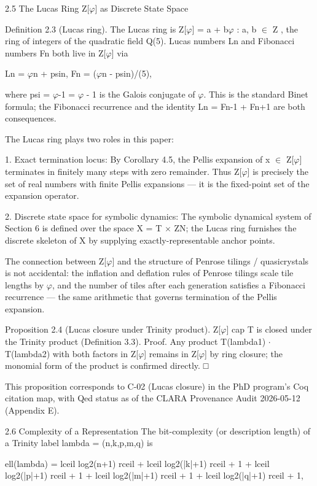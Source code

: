   2.5 The Lucas Ring Z[$\varphi$] as Discrete State Space

        Definition 2.3 (Lucas ring). The Lucas ring is Z[$\varphi$] = { a + b$\varphi$ : a, b $\in$ Z }, the
        ring of integers of the quadratic field Q(5). Lucas numbers Ln and Fibonacci
        numbers Fn both live in Z[$\varphi$] via

  Ln = $\varphi$n + psin, Fn = ($\varphi$n - psin)/(5),

  where psi = $\varphi$-1 = $\varphi$ - 1 is the Galois conjugate of $\varphi$. This is the standard Binet formula;
  the Fibonacci recurrence and the identity Ln = Fn-1 + Fn+1 are both consequences.

  The Lucas ring plays two roles in this paper:

  1. Exact termination locus: By Corollary 4.5, the Pellis expansion of x $\in$ Z[$\varphi$] terminates
  in finitely many steps with zero remainder. Thus Z[$\varphi$] is precisely the set of real
  numbers with finite Pellis expansions --- it is the fixed-point set of the expansion
  operator.

  2. Discrete state space for symbolic dynamics: The symbolic dynamical system of
  Section 6 is defined over the space X = T $\times$ ZN; the Lucas ring furnishes the discrete
  skeleton of X by supplying exactly-representable anchor points.

  The connection between Z[$\varphi$] and the structure of Penrose tilings / quasicrystals is not
  accidental: the inflation and deflation rules of Penrose tilings scale tile lengths by $\varphi$,
  and the number of tiles after each generation satisfies a Fibonacci recurrence --- the
  same arithmetic that governs termination of the Pellis expansion.

        Proposition 2.4 (Lucas closure under Trinity product). Z[$\varphi$] cap T is closed
        under the Trinity product (Definition 3.3). Proof. Any product T(lambda1) $\cdot$
        T(lambda2) with both factors in Z[$\varphi$] remains in Z[$\varphi$] by ring closure; the
        monomial form of the product is confirmed directly. □

  This proposition corresponds to C-02 (Lucas closure) in the PhD program's Coq citation
  map, with Qed status as of the CLARA Provenance Audit 2026-05-12 (Appendix E).

  2.6 Complexity of a Representation
  The bit-complexity (or description length) of a Trinity label lambda = (n,k,p,m,q) is

  ell(lambda) = lceil log2(n+1) rceil + lceil log2(|k|+1) rceil + 1 + lceil log2(|p|+1) rceil
  + 1 + lceil log2(|m|+1) rceil + 1 + lceil log2(|q|+1) rceil + 1,

